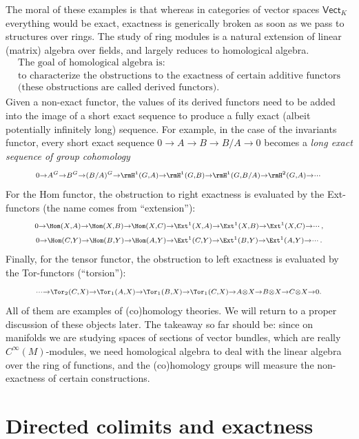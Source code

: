 The moral of these examples is that whereas in categories of vector spaces $\mathsf{Vect}_K$ everything would be exact, exactness is generically broken as soon as we pass to structures over rings. The study of ring modules is a natural extension of linear (matrix) algebra over fields, and largely reduces to homological algebra.
\[
    \boxed{\begin{array}{c}
    \text{The goal of homological algebra is:}\\
    \text{to characterize the obstructions to the exactness of certain additive functors}\\ \text{(these obstructions are called derived functors).}
    \end{array}}
\]
Given a non-exact functor, the values of its derived functors need to be added into the image of a short exact sequence to produce a fully exact (albeit potentially infinitely long) sequence. For example, in the case of the invariants functor, every short exact sequence $0\to A\to B\to B/A\to 0$ becomes a \emph{long exact sequence of group cohomology} 
\[
    \scriptstyle
    0\to A^G\to B^G\to (B/A)^G\to \rmH^1(G,A)\to \rmH^1(G,B)\to \rmH^1(G,B/A)\to \rmH^2(G,A)\to\cdots
\]
For the Hom functor, the obstruction to right exactness is evaluated by the Ext-functors (the name comes from ``extension''):
\begin{gather}
    \scriptstyle
    0\to \Hom(X,A)\to \Hom(X,B)\to\Hom(X,C)\to \Ext^1(X,A)\to \Ext^1(X,B)\to\Ext^1(X,C)\to\cdots,\\
    \scriptstyle
    0\to \Hom(C,Y)\to \Hom(B,Y)\to\Hom(A,Y)\to \Ext^1(C,Y)\to \Ext^1(B,Y)\to\Ext^1(A,Y)\to\cdots.
\end{gather}
Finally, for the tensor functor, the obstruction to left exactness is evaluated by the Tor-functors (``torsion''):
\[
    \scriptstyle
    \cdots\to \Tor_2(C,X)\to \Tor_1(A,X)\to \Tor_1(B,X)\to\Tor_1(C,X)\to A\otimes X\to B\otimes X\to C\otimes X\to 0.
\]
All of them are examples of (co)homology theories. We will return to a proper discussion of these objects later. The takeaway so far should be: since on manifolds we are studying spaces of sections of vector bundles, which are really $C^\infty(M)$-modules, we need homological algebra to deal with the linear algebra over the ring of functions, and the (co)homology groups will measure the non-exactness of certain constructions.






\section{Directed colimits and exactness}

